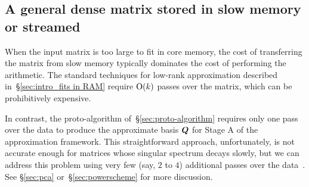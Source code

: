 \documentclass{article}
\newtheorem{remark}{Remark}
\begin{document}


\subsection{A general dense matrix stored in slow memory or streamed}

When the input matrix is too large to fit in core memory, the cost of
transferring the matrix from slow memory typically dominates the cost
of performing the arithmetic.  The standard techniques for low-rank
approximation described in~\S\ref{sec:intro_fits in RAM} require
$\mathrm{O}(k)$ passes over the matrix, which can be prohibitively expensive.

In contrast, the proto-algorithm of~\S\ref{sec:proto-algorithm}
requires only one pass over the data to produce the approximate basis
$\bm{Q}$ for Stage A of the approximation framework.
This straightforward approach, unfortunately, is not accurate enough for
matrices whose singular spectrum decays slowly, but we can address this
problem using very few (say, $2$ to $4$) additional passes over the
data~\cite{tygert_szlam}.
See \S\ref{sec:pca} or~\S\ref{sec:powerscheme} for more discussion.
\end{document}
